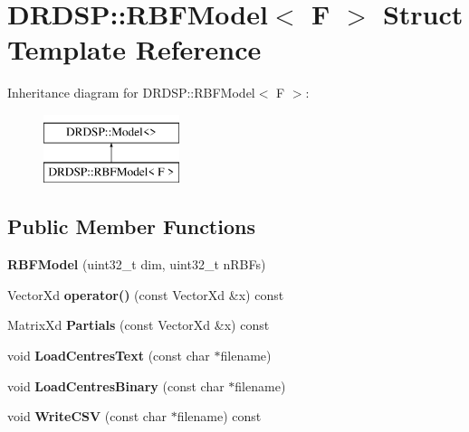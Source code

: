 \hypertarget{struct_d_r_d_s_p_1_1_r_b_f_model}{\section{D\-R\-D\-S\-P\-:\-:R\-B\-F\-Model$<$ F $>$ Struct Template Reference}
\label{struct_d_r_d_s_p_1_1_r_b_f_model}
}
Inheritance diagram for D\-R\-D\-S\-P\-:\-:R\-B\-F\-Model$<$ F $>$\-:\begin{figure}[H]
\begin{center}
\leavevmode
\includegraphics[height=2.000000cm]{struct_d_r_d_s_p_1_1_r_b_f_model}
\end{center}
\end{figure}
\subsection*{Public Member Functions}
\begin{DoxyCompactItemize}
\item 
\hypertarget{struct_d_r_d_s_p_1_1_r_b_f_model_a3f1cbdc52c3439d9936f1703950eb275}{{\bfseries R\-B\-F\-Model} (uint32\-\_\-t dim, uint32\-\_\-t n\-R\-B\-Fs)}\label{struct_d_r_d_s_p_1_1_r_b_f_model_a3f1cbdc52c3439d9936f1703950eb275}

\item 
\hypertarget{struct_d_r_d_s_p_1_1_r_b_f_model_a097398c265c5a82ee0d948dcc26575b6}{Vector\-Xd {\bfseries operator()} (const Vector\-Xd \&x) const }\label{struct_d_r_d_s_p_1_1_r_b_f_model_a097398c265c5a82ee0d948dcc26575b6}

\item 
\hypertarget{struct_d_r_d_s_p_1_1_r_b_f_model_a72e4968e1457515616efcb1428685c49}{Matrix\-Xd {\bfseries Partials} (const Vector\-Xd \&x) const }\label{struct_d_r_d_s_p_1_1_r_b_f_model_a72e4968e1457515616efcb1428685c49}

\item 
\hypertarget{struct_d_r_d_s_p_1_1_r_b_f_model_afe0b01366727ad77ef1d3ea42ccfcdb1}{void {\bfseries Load\-Centres\-Text} (const char $\ast$filename)}\label{struct_d_r_d_s_p_1_1_r_b_f_model_afe0b01366727ad77ef1d3ea42ccfcdb1}

\item 
\hypertarget{struct_d_r_d_s_p_1_1_r_b_f_model_a7fafa6d253c14a0dd633c39b5a297c51}{void {\bfseries Load\-Centres\-Binary} (const char $\ast$filename)}\label{struct_d_r_d_s_p_1_1_r_b_f_model_a7fafa6d253c14a0dd633c39b5a297c51}

\item 
\hypertarget{struct_d_r_d_s_p_1_1_r_b_f_model_a3c20e3ed4678798de71698f8c4b415f3}{void {\bfseries Write\-C\-S\-V} (const char $\ast$filename) const }\label{struct_d_r_d_s_p_1_1_r_b_f_model_a3c20e3ed4678798de71698f8c4b415f3}

\end{DoxyCompactItemize}
